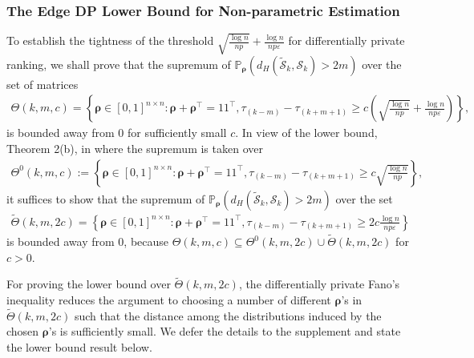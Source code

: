 \documentclass[letterpaper,12pt]{article}
\numberwithin{equation}{section}
\theoremstyle{plain}
\numberwithin{Theorem}{section}
\numberwithin{corollary}{section}
\numberwithin{proposition}{section}
\numberwithin{Lemma}{section}
{
	\theoremstyle{definition}
	\newtheorem{Definition}{Definition}
	\newtheorem{example}{Example}
	\numberwithin{example}{section}
	\newtheorem{fact}{Fact}
	\numberwithin{fact}{section}
	\newtheorem{remark}{Remark}
}
\newcommand{\Pro}{\mathbb{P}}
\newcommand{\1}{\mathbbm{1}}
\begin{document}
\subsubsection{The Edge DP Lower Bound for Non-parametric Estimation}\label{sec: nonparametric lower bound}
To establish the tightness of the threshold $\sqrt{\frac{\log n}{np}} + \frac{\log n}{np\varepsilon}$ for differentially private ranking, we shall prove that the supremum of $\Pro_{\bm \rho}\left(d_H(\widetilde {\mathcal S}_k, \mathcal S_k) > 2m \right)$ over the set of matrices
\begin{align*}
	\Theta(k,m,c) = \left\{\bm \rho \in [0,1]^{n \times n}: \bm \rho + \bm \rho^\top = 11^\top, \tau_{(k-m)} - \tau_{(k+m+1)} \geq c\left(\sqrt{\frac{\log n}{np}} + \frac{\log n}{np\varepsilon}\right)\right\},
\end{align*}
is bounded away from $0$ for sufficiently small $c$. In view of the lower bound, Theorem 2(b), in \cite{shah2017simple} where the supremum is taken over 
\begin{align*}
	\Theta^0(k,m, c) := \left\{\bm \rho \in [0,1]^{n \times n}: \bm \rho + \bm \rho^\top = 11^\top, \tau_{(k-m)} - \tau_{(k+m+1)} \geq c\sqrt{\frac{\log n}{np}}\right\},
\end{align*}
it suffices to show that the supremum of $\Pro_{\bm \rho}\left(d_H(\widetilde {\mathcal S}_k, \mathcal S_k) > 2m \right)$ over the set
\begin{align*}
	\widetilde\Theta(k, m, 2c) = \left\{\bm \rho \in [0,1]^{n \times n}: \bm \rho + \bm \rho^\top = 11^\top, \tau_{(k-m)} - \tau_{(k+m+1)} \geq 2c\frac{\log n}{np\varepsilon}\right\}
\end{align*}
is bounded away from 0, because 
$\Theta(k,m,c) \subseteq \Theta^0(k,m, 2c) \cup \widetilde\Theta(k, m, 2c)$ for $c > 0$.

For proving the lower bound over $\widetilde\Theta(k, m, 2c)$, the differentially private Fano's inequality \cite{barber2014privacy, acharya2021differentially} reduces the argument to choosing a number of different $\bm \rho$'s in $\widetilde\Theta(k, m, 2c)$ such that the distance among the distributions induced by the chosen $\bm \rho$'s is sufficiently small. We defer the details to the supplement \cite{cai2023optimal} and state the lower bound result below.
\end{document}
